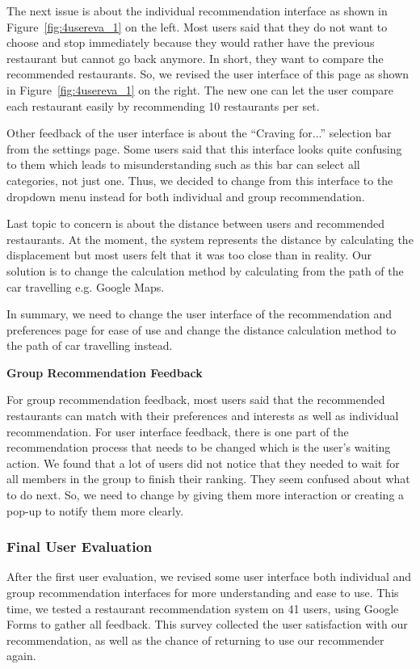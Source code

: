 \documentclass[12pt,oneside,openright,a4paper]{cpe-english-project}
\begin{document}
The next issue is about the individual recommendation interface as shown in  Figure~\ref{fig:4usereva_1} on the left. Most users said that they do not want to choose and stop immediately because they would rather have the previous restaurant but cannot go back anymore. In short, they want to compare the recommended restaurants. So, we revised the user interface of this page as shown in Figure~\ref{fig:4usereva_1} on the right. The new one can let the user compare each restaurant easily by recommending 10 restaurants per set.

Other feedback of the user interface is about the “Craving for...” selection bar from the settings page. Some users said that this interface looks quite confusing to them which leads to misunderstanding such as this bar can select all categories, not just one. Thus, we decided to change from this interface to the dropdown menu instead for both individual and group recommendation.

Last topic to concern is about the distance between users and recommended restaurants. At the moment, the system represents the distance by calculating the displacement but most users felt that it was too close than in reality. Our solution is to change the calculation method by calculating from the path of the car travelling e.g. Google Maps.

In summary, we need to change the user interface of the recommendation and preferences page for ease of use and change the distance calculation method to the path of car travelling instead.

\textbf{Group Recommendation Feedback}\par

For group recommendation feedback, most users said that the recommended restaurants can match with their preferences and interests as well as individual recommendation. For user interface feedback, there is one part of the recommendation process that needs to be changed which is the user’s waiting action. We found that a lot of users did not notice that they needed to wait for all members in the group to finish their ranking. They seem confused about what to do next. So, we need to change by giving them more interaction or creating a pop-up to notify them more clearly.

\subsubsection{Final User Evaluation}

After the first user evaluation, we revised some user interface both individual and group recommendation interfaces for more understanding and ease to use. This time, we tested a restaurant recommendation system on 41 users, using Google Forms to gather all feedback. This survey collected the user satisfaction with our recommendation, as well as the chance of  returning to use our recommender again.
\end{document}
